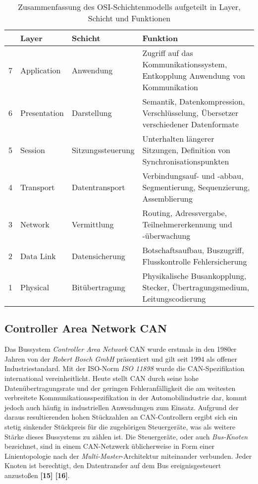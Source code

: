 \begin{table}[!htbp]
	\centering
	\caption{Zusammenfassung des OSI-Schichtenmodells aufgeteilt in Layer,
		Schicht und Funktionen}
	\renewcommand{\arraystretch}{1.3}
	\begin{tabular}{l l l p{7.5cm}}
														  	   \toprule
		  &  Layer        & Schicht           & Funktion	\\ \midrule
		7 & Application  & Anwendung         & Zugriff auf das Kommunikationssystem, Entkopplung Anwendung von Kommunikation    		\\
		\rowcolor[gray]{.9} 6 & Presentation & Darstellung       & Semantik, Datenkompression, Verschlüsselung,
		Übersetzer verschiedener Datenformate 			\\
		\rowcolor[gray]{.9} 5 & Session      & Sitzungssteuerung & Unterhalten längerer Sitzungen, Definition von
		Synchronisationspunkten            				\\
		4 & Transport    & Datentransport    & Verbindungsauf- und -abbau, Segmentierung,
		Sequenzierung, Assemblierung            		\\
		\rowcolor[gray]{.9} 3 & Network      & Vermittlung       & Routing, Adressvergabe, Teilnehmererkennung
		und -überwachung                       			\\
		2 & Data Link    & Datensicherung    & Botschaftsaufbau, Buszugriff, Flusskontrolle
		Fehlersicherung                       			\\
		1 & Physical     & Bitübertragung    & Physikalische Busankopplung, Stecker,
		Übertragungsmedium, Leitungscodierung        	\\ \bottomrule
	\end{tabular}
	
	\label{tab:OSI-Schichtenmodell}
\end{table}


\subsection{Controller Area Network CAN} \label{subsec:CAN}
Das Bussystem \emph{Controller Area Network} \acs{CAN} wurde erstmals in den 1980er Jahren von der \emph{Robert Bosch GmbH} präsentiert und gilt seit 1994 als offener Industriestandard. Mit der \acs{ISO}-Norm \emph{ISO 11898} wurde die \acs{CAN}-Spezifikation international vereinheitlicht. Heute stellt \acs{CAN} durch seine hohe Datenübertragungsrate und der geringen Fehleranfälligkeit die am weitesten verbreitete Kommunikationsspezifikation in der Automobilindustrie dar, kommt jedoch auch häufig in industriellen Anwendungen zum Einsatz. Aufgrund der daraus resultierenden hohen Stückzahlen an \acs{CAN}-Controllern ergibt sich ein stetig sinkender Stückpreis für die zugehörigen Steuergeräte, was als weitere Stärke dieses Bussystems zu zählen ist. 
Die Steuergeräte, oder auch \emph{Bus-Knoten} bezeichnet, sind in einem \acs{CAN}-Netzwerk üblicherweise in Form einer Linientopologie nach der \emph{Multi-Master}-Architektur miteinander verbunden. Jeder Knoten ist berechtigt, den Datentransfer auf dem Bus ereignisgesteuert anzustoßen \textbf{[15] [16]}.

